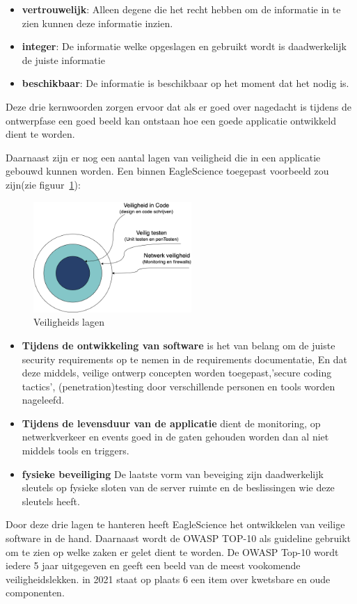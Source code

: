 \begin{itemize}
    \item \textbf{vertrouwelijk}: Alleen degene die het recht hebben om de informatie in te zien kunnen deze informatie inzien.
    \item \textbf{integer}: De informatie welke opgeslagen en gebruikt wordt is daadwerkelijk de juiste informatie
    \item \textbf{beschikbaar}: De informatie is beschikbaar op het moment dat het nodig is.
\end{itemize}
Deze drie kernwoorden zorgen ervoor dat als er goed over nagedacht is tijdens de ontwerpfase een goed beeld kan ontstaan hoe een goede applicatie ontwikkeld dient te worden.

Daarnaast zijn er nog een aantal lagen van veiligheid die in een applicatie gebouwd kunnen worden.
Een binnen EagleScience toegepast voorbeeld zou zijn(zie figuur~\ref{fig:veiligheidslagen}):

\begin{figure}[H]
    \centering
    \includegraphics[width=6cm]{gfx/veiligheids lagen}
    \caption{Veiligheids lagen}
    \label{fig:veiligheidslagen}
\end{figure}

\begin{itemize}
    \item \textbf{Tijdens de ontwikkeling van software} is het van belang om de juiste security requirements op te nemen in de requirements documentatie, En dat deze middels, veilige ontwerp concepten worden toegepast,'secure coding tactics', (penetration)testing door verschillende personen en tools worden nageleefd.
    \item \textbf{Tijdens de levensduur van de applicatie} dient de monitoring, op netwerkverkeer en events goed in de gaten gehouden worden dan al niet middels tools en triggers.
    \item \textbf{fysieke beveiliging} De laatste vorm van beveiging zijn daadwerkelijk sleutels op fysieke sloten van de server ruimte en de beslissingen wie deze sleutels heeft.
\end{itemize}
Door deze drie lagen te hanteren heeft EagleScience het ontwikkelen van veilige software in de hand. Daarnaast wordt de OWASP TOP-10 als guideline gebruikt om te zien op welke zaken er gelet dient te worden. De OWASP Top-10 wordt iedere 5 jaar uitgegeven en geeft een beeld van de meest vookomende veiligheidslekken. in 2021 staat op plaats 6 een item over kwetsbare en oude componenten. \cite{Kohnfelder2021}


